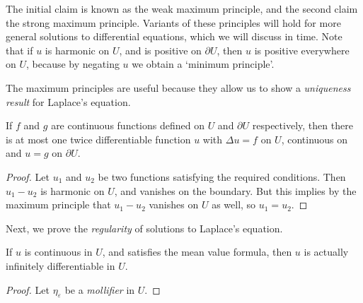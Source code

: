 The initial claim is known as the weak maximum principle, and the second claim the strong maximum principle. Variants of these principles will hold for more general solutions to differential equations, which we will discuss in time. Note that if $u$ is harmonic on $U$, and is positive on $\partial U$, then $u$ is positive everywhere on $U$, because by negating $u$ we obtain a `minimum principle'.

The maximum principles are useful because they allow us to show a {\it uniqueness result} for Laplace's equation.

\begin{theorem}
    If $f$ and $g$ are continuous functions defined on $U$ and $\partial U$ respectively, then there is at most one twice differentiable function $u$ with $\Delta u = f$ on $U$, continuous on  and $u = g$ on $\partial U$.
\end{theorem}
\begin{proof}
    Let $u_1$ and $u_2$ be two functions satisfying the required conditions. Then $u_1 - u_2$ is harmonic on $U$, and vanishes on the boundary. But this implies by the maximum principle that $u_1 - u_2$ vanishes on $U$ as well, so $u_1 = u_2$.
\end{proof}

Next, we prove the {\it regularity} of solutions to Laplace's equation.

\begin{theorem}
    If $u$ is continuous in $U$, and satisfies the mean value formula, then $u$ is actually infinitely differentiable in $U$.
\end{theorem}
\begin{proof}
    Let $\eta_\varepsilon$ be a {\it mollifier} in $U$. 
\end{proof}


